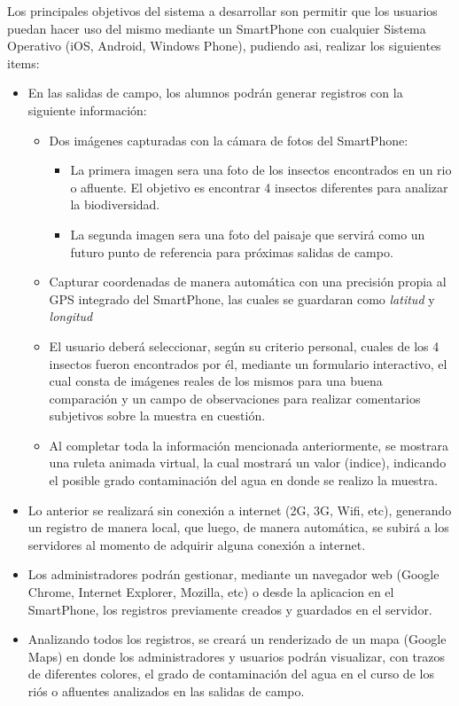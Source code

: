Los principales objetivos del sistema a desarrollar son permitir que los usuarios puedan hacer uso del mismo mediante un SmartPhone con cualquier Sistema Operativo (iOS, Android, Windows Phone), pudiendo asi, realizar los siguientes items:
\begin{itemize}
    \item En las salidas de campo, los alumnos podrán generar registros con la siguiente información:
    \begin{itemize}
        \item Dos imágenes capturadas con la cámara de fotos del SmartPhone:
        \begin{itemize}
            \item La primera imagen sera una foto de los insectos encontrados en un rio o afluente. El objetivo es encontrar 4 insectos diferentes para analizar la biodiversidad.
            \item La segunda imagen sera una foto del paisaje que servirá como un futuro punto de referencia para próximas salidas de campo. 
        \end{itemize}
        \item Capturar coordenadas de manera automática con una precisión propia al GPS integrado del SmartPhone, las cuales se guardaran como \emph{latitud} y \emph{longitud}
        \item El usuario deberá seleccionar, según su criterio personal, cuales de los 4 insectos fueron encontrados por él, mediante un formulario interactivo, el cual consta de imágenes reales de los mismos para una buena comparación y un campo de observaciones para realizar comentarios subjetivos sobre la muestra en cuestión.
        \item Al completar toda la información mencionada anteriormente, se mostrara una ruleta animada virtual, la cual mostrará un valor (indice), indicando el posible grado contaminación del agua en donde se realizo la muestra.
    \end{itemize}
    \item Lo anterior se realizará sin conexión a internet (2G, 3G, Wifi, etc), generando un registro de manera local, que luego, de manera automática, se subirá a los servidores al momento de adquirir alguna conexión a internet.
    \item Los administradores podrán gestionar, mediante un navegador web (Google Chrome, Internet Explorer, Mozilla, etc) o desde la aplicacion en el SmartPhone, los registros previamente creados y guardados en el servidor. 
    \item Analizando todos los registros, se creará un renderizado de un mapa  (Google Maps) en donde los administradores y usuarios podrán visualizar, con trazos de diferentes colores, el grado de contaminación del agua en el curso de los riós o afluentes analizados en las salidas de campo.
\end{itemize}
 

